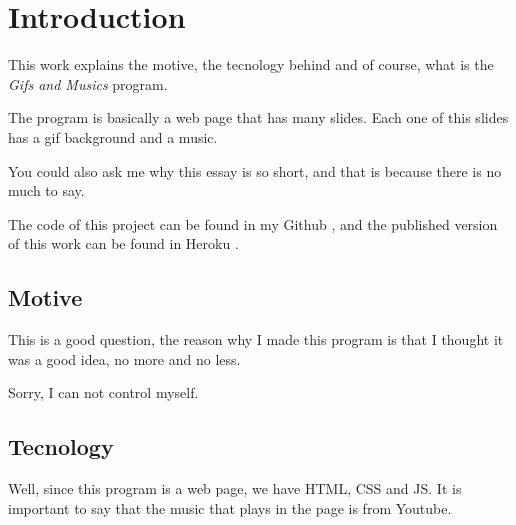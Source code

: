 
\section{Introduction} %

This work explains the motive, the tecnology behind and of course, what is the \textit{Gifs and Musics} program.

The program is basically a web page that has many slides. Each one of this slides has a gif background and a music.
 
You could also ask me why this essay is so short, and that is because there is no much to say.

The code of this project can be found in my Github \cite{craviee}, and the published version of this work can be found in Heroku \cite{heroku}.
	


\subsection{Motive} %

This is a good question, the reason why I made this program is that I thought it was a good idea, no more and no less.

Sorry, I can not control myself.


\subsection{Tecnology} %
\label{sec:tec}

Well, since this program is a web page, we have HTML, CSS and JS.
It is important to say that the music that plays in the page is from Youtube.

